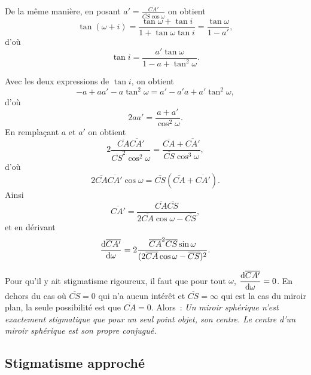 De la même manière, en posant $a' = \frac{\overline{CA'}}{\overline{CS} \cos \omega}$ on obtient
\begin{equation}
  \tan(\omega+i) = \frac{\tan \omega +\tan i}{1+ \tan\omega \tan i} =\frac{\tan \omega}{1-a'},
\end{equation}
d'où
\begin{equation}
  \tan i = \frac{a' \tan \omega}{1-a+\tan^2 \omega}.
\end{equation}

Avec les deux expressions de $\tan i$, on obtient
\begin{equation}
  -a +aa' -a\tan^2\omega = a'-a'a+a'\tan^2\omega,
\end{equation}
d'où
\begin{equation}
  2aa' = \frac{a+a'}{\cos^2\omega}.
\end{equation}
En remplaçant $a$ et $a'$ on obtient
\begin{equation}
  2 \frac{\overline{CA}\overline{CA'}}{\overline{CS}^2\cos^2\omega} = \frac{\overline{CA} + \overline{CA'}}{\overline{CS} \cos^3\omega},
\end{equation}
d'où
\begin{equation}
  \label{eq:stigrigoureux}
  2 \overline{CA} \overline{CA'} \cos\omega = \overline{CS}(\overline{CA}+ \overline{CA'}).
\end{equation}
Ainsi
\begin{equation}
  \overline{CA'} = \frac{\overline{CA} \overline{CS}}{2 \overline{CA} \cos \omega - \overline{CS}},
\end{equation}
et en dérivant
\begin{equation}
  \dfrac{\mathrm{d} \overline{CA'}}{\mathrm{d} \omega} = 2 \frac{\overline{CA}^2 \overline{CS} \sin\omega}{(2 \overline{CA} \cos \omega - \overline{CS})^2}.
\end{equation}

Pour qu'il y ait stigmatisme rigoureux, il faut que pour tout $\omega$, $\dfrac{\mathrm{d} \overline{CA'}}{\mathrm{d} \omega} = 0$. En dehors du cas où $\overline{CS}=0$ qui n'a aucun intérêt et $\overline{CS}=\infty$ qui est la cas du miroir plan, la seule possibilité est que $\overline{CA}=0$. Alors~:
\emph{Un miroir sphérique n'est exactement stigmatique que  pour un seul point objet, son centre. Le centre d'un miroir sphérique est son propre conjugué.}

\subsection{Stigmatisme approché}
\label{chap7-subsec:stigmatismeapproche}

